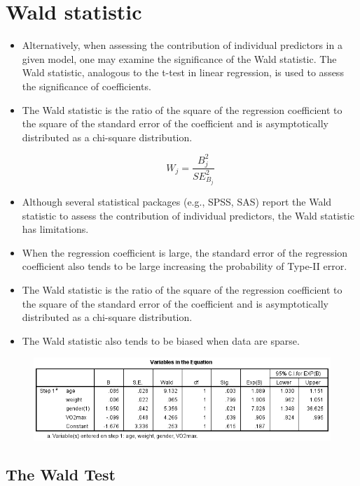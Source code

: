 \documentclass[a4paper,12pt]{article}
\begin{document}
	\section{Wald statistic}
\begin{itemize}
	\item Alternatively, when assessing the contribution of individual predictors in a given model, one may examine the significance of the Wald statistic. The Wald statistic, analogous to the t-test in linear regression, is used to assess the significance of coefficients. 
 

	
	\item The Wald statistic is the ratio of the square of the regression coefficient to the square of the standard error of the coefficient and is asymptotically distributed as a chi-square distribution.
	
	\[W_j = \frac{B^2_j} {SE^2_{B_j}}\]
	
	\item Although several statistical packages (e.g., SPSS, SAS) report the Wald statistic to assess the contribution of individual predictors, the Wald statistic has limitations. 
	\item When the regression coefficient is large, the standard error of the regression coefficient also tends to be large increasing the probability of Type-II error. 
	
	\item The Wald statistic is the ratio of the square of the regression coefficient to the square of the standard error of the coefficient and is asymptotically distributed as a chi-square distribution.
	
	\item The Wald statistic also tends to be biased when data are sparse.
\end{itemize}
\begin{figure}[h!]
	\centering
	\includegraphics[width=0.7\linewidth]{images/waldtest}
	\caption{}
	\label{fig:waldtest}
\end{figure}

\subsection{The Wald Test}
\end{document}
